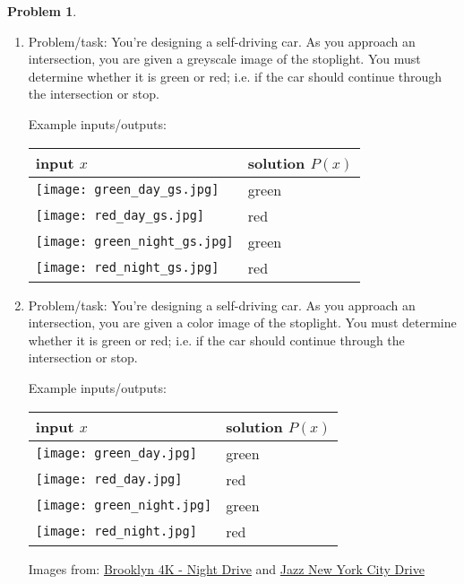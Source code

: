 \documentclass[12pt]{article}
\theoremstyle{definition}
\newtheorem{problem}{Problem}
\begin{document}
\begin{problem}
\begin{enumerate}
\clearpage

\item Problem/task: You're designing a self-driving car. 
            As you approach an intersection, you are given a greyscale image of the stoplight. 
            You must determine whether it is green or red; i.e. if the car should continue through the intersection or stop.
        
            Example inputs/outputs:

            \begin{center}
            \begin{tabular}{>{\centering\arraybackslash}m{2in}>{\centering\arraybackslash}m{2in}}
            \toprule
                input $x$ & solution $P(x)$ \\ \midrule
            \texttt{[image: green\_day\_gs.jpg]} & green \\
            \texttt{[image: red\_day\_gs.jpg]} & red \\
            \texttt{[image: green\_night\_gs.jpg]} & green \\
            \texttt{[image: red\_night\_gs.jpg]} & red \\
                \bottomrule
            \end{tabular}
            \end{center}
\clearpage


        \item Problem/task: You're designing a self-driving car. 
            As you approach an intersection, you are given a color image of the stoplight. 
            You must determine whether it is green or red; i.e. if the car should continue through the intersection or stop.
            
            Example inputs/outputs:

            \begin{center}
            \begin{tabular}{>{\centering\arraybackslash}m{2in}>{\centering\arraybackslash}m{2in}}
            \toprule
                input $x$ & solution $P(x)$ \\ \midrule
            \texttt{[image: green\_day.jpg]} & green \\
            \texttt{[image: red\_day.jpg]} & red \\
            \texttt{[image: green\_night.jpg]} & green \\
            \texttt{[image: red\_night.jpg]} & red \\
                \bottomrule
            \end{tabular}
            \end{center}

       
            Images from:
            \href{https://www.youtube.com/watch?v=yhCAWZlv_Sc}{Brooklyn 4K - Night Drive}
            and \href{https://www.youtube.com/watch?v=eyu0d1x5TMs}{Jazz New York City Drive}

    \end{enumerate}
\end{problem}
\end{document}
